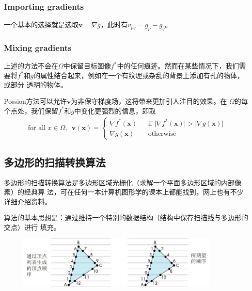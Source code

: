 \documentclass{article}
\begin{document}
	\subsubsection{Importing gradients}
	一个基本的选择就是选取$\textbf{v}=\nabla g$，此时有$v_{pq}=g_p-g_q$。

	\subsubsection{Mixing gradients}
	上述的方法不会在$\Omega$中保留目标图像$f^*$中的任何痕迹。然而在某些情况下，我们需
	要将$f^*$和$g$的属性结合起来，例如在一个有纹理或杂乱的背景上添加有孔的物体，或部分
	透明的物体。
	
	Possion方法可以允许$\textbf{v}$为非保守梯度场，这将带来更加引人注目的效果。在
	$\Omega$的每个点处，我们保留$f^*$和$g$中变化更强烈的信息，即取
	\begin{eqnarray}
		\text{ for all }x\in\Omega,\enspace\textbf{v}(\textbf{x})=\left\{
		\begin{array}{lcl}
		\nabla f^*(\textbf{x})&	&\text{if }\vert\nabla 
		f^*(\textbf{x})\vert>\vert\nabla g(\textbf{x})\vert\\
		\nabla g(\textbf{x})&	&\text{otherwise} 
		\end{array} \right.
	\end{eqnarray}





	\subsection{多边形的扫描转换算法}
	多边形的扫描转换算法是多边形区域光栅化（求解一个平面多边形区域的内部像素）的经典算
	法，可在任何一本计算机图形学的课本上都能找到，网上也有不少详细介绍资料。
	
	算法的基本思想是：通过维持一个特别的数据结构（结构中保存扫描线与多边形的交点）进行
	填充。
	\begin{figure}[htb]
		\begin{center}
			\includegraphics[width=4in]{scan_line.jpg}
		\end{center}
	\end{figure}
	
	\clearpage
\end{document}
